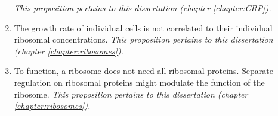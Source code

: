 \begin{enumerate}[nosep]
    \textit{This proposition pertains to this dissertation (chapter \ref{chapter:CRP}).}
    \item
    The growth rate of individual cells is not correlated to their individual ribosomal concentrations.
    \textit{This proposition pertains to this dissertation (chapter \ref{chapter:ribosomes}).}
    \item
    To function, a ribosome does not need all ribosomal proteins.  
    Separate regulation on ribosomal proteins might modulate the function of the ribosome. 
    \textit{This proposition pertains to this dissertation (chapter \ref{chapter:ribosomes}).}
\end{enumerate}


